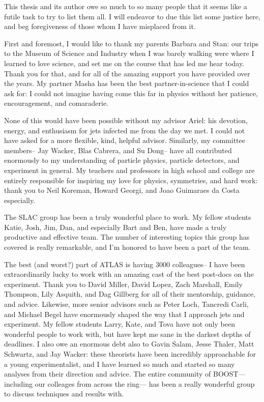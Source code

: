 
This thesis and its author owe so much to so many people that it seems like a futile task to try to list them all. I will endeavor to due this list some justice here, and beg foregiveness of those whom I have misplaced from it.

First and foremost, I would like to thank my parents Barbara and Stan: our trips to the Museum of Science and Industry when I was barely walking were where I learned to love science, and set me on the course that has led me hear today. Thank you for that, and for all of the amazing support you have provided over the years. My partner Masha has been the best partner-in-science that I could ask for: I could not imagine having come this far in physics without her patience, encouragement, and comaraderie. 

None of this would have been possible without my advisor Ariel: his devotion, energy, and enthusiasm for jets infected me from the day we met. I could not have asked for a more flexible, kind, helpful advisor. Similarly, my committee members-- Jay Wacker, Blas Cabrera, and Su Dong-- have all contributed enormously to my understanding of particle physics, particle detectors, and experiment in general. My teachers and professors in high school and college are entirely responsible for inspiring my love for physics, symmetries, and hard work: thank you to Neil Koreman, Howard Georgi, and Joao Guimaraes da Costa especially. 

The SLAC group has been a truly wonderful place to work. My fellow students Katie, Josh, Jim, Dan, and especially Bart and Ben, have made a truly productive and effective team. The number of interesting topics this group has covered is really remarkable, and I'm honored to have been a part of the team.

The best (and worst?) part of ATLAS is having 3000 colleagues-- I have been extraordinarily lucky to work with an amazing cast of the best post-docs on the experiment. Thank you to David Miller, David Lopez, Zach Marshall, Emily Thompson, Lily Asquith, and Dag Gillberg for all of their mentorship, guidance, and advice. Likewise, more senior advisors such as Peter Loch, Tancredi Carli, and Michael Begel have enormously shaped the way that I approach jets and experiment. My fellow students Larry, Kate, and Tova have not only been wonderful people to work with, but have kept me sane in the darkest depths of deadlines. I also owe an enormous debt also to Gavin Salam, Jesse Thaler, Matt Schwartz, and Jay Wacker: these theorists have been incredibly approachable for a young experimentalist, and I have learned so much and started so many analyses from their direction and advice. The entire community of BOOST--- including our colleages from across the ring--- has been a really wonderful group to discuss techniques and results with.

